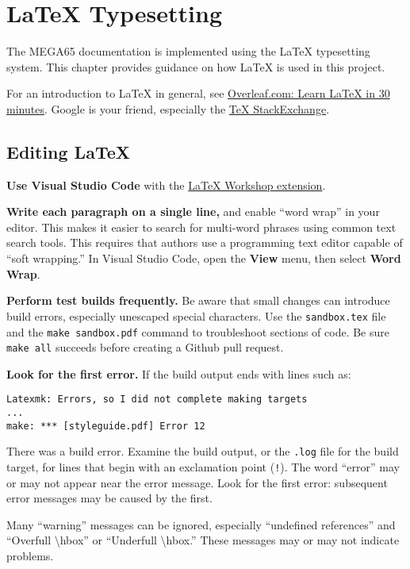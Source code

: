 \chapter{LaTeX Typesetting}

The MEGA65 documentation is implemented using the LaTeX typesetting system. This chapter provides guidance on how LaTeX is used in this project.

For an introduction to LaTeX in general, see \href{https://www.overleaf.com/learn/latex/Learn_LaTeX_in_30_minutes}{Overleaf.com: Learn LaTeX in 30 minutes}. Google is your friend, especially the \href{https://tex.stackexchange.com/}{TeX StackExchange}.

\section{Editing LaTeX}

\textbf{Use Visual Studio Code} with the \href{https://marketplace.visualstudio.com/items?itemName=James-Yu.latex-workshop}{LaTeX Workshop extension}.

\textbf{Write each paragraph on a single line,} and enable ``word wrap'' in your editor. This makes it easier to search for multi-word phrases using common text search tools. This requires that authors use a programming text editor capable of ``soft wrapping.'' In Visual Studio Code, open the \textbf{View} menu, then select \textbf{Word Wrap}.

\textbf{Perform test builds frequently.} Be aware that small changes can introduce build errors, especially unescaped special characters. Use the \texttt{sandbox.tex} file and the \texttt{make sandbox.pdf} command to troubleshoot sections of code. Be sure \texttt{make all} succeeds before creating a Github pull request.

\textbf{Look for the first error.} If the build output ends with lines such as:

\begin{verbatim}
Latexmk: Errors, so I did not complete making targets
...
make: *** [styleguide.pdf] Error 12
\end{verbatim}

There was a build error. Examine the build output, or the \texttt{.log} file for the build target, for lines that begin with an exclamation point (\texttt{!}). The word ``error'' may or may not appear near the error message. Look for the first error: subsequent error messages may be caused by the first.

Many ``warning'' messages can be ignored, especially ``undefined references'' and ``Overfull {\textbackslash}hbox'' or ``Underfull {\textbackslash}hbox.'' These messages may or may not indicate problems.

